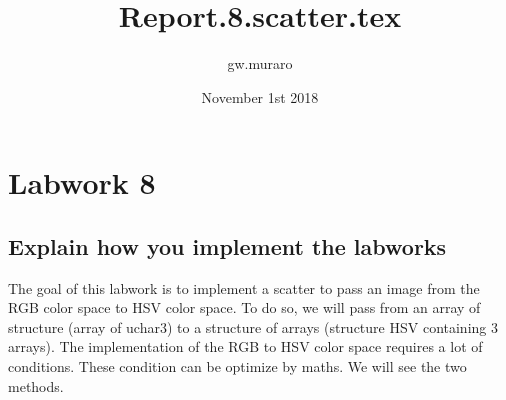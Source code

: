 \documentclass{article}
\title{Report.8.scatter.tex}
\author{gw.muraro}
\date{November 1st 2018}
\begin{document}
\maketitle
\section{Labwork 8}

\subsection{Explain how you implement the labworks}

   The goal of this labwork is to implement a scatter to pass an image from the RGB color space to HSV color space. To do so, we will pass from an array of structure (array of uchar3) to a structure of arrays (structure HSV containing 3 arrays). The implementation of the RGB to HSV color space requires a lot of conditions. These condition can be optimize by maths. We will see the two methods. 
\end{document}
